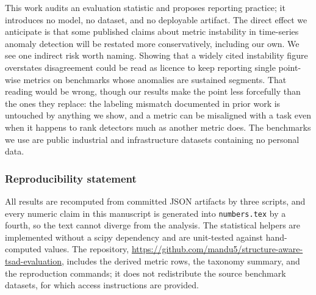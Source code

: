 \documentclass[twoside,11pt]{article}
\begin{document}
This work audits an evaluation statistic and proposes reporting practice; it
introduces no model, no dataset, and no deployable artifact. The direct effect
we anticipate is that some published claims about metric instability in
time-series anomaly detection will be restated more conservatively, including
our own. We see one indirect risk worth naming. Showing that a widely cited
instability figure overstates disagreement could be read as licence to keep
reporting single point-wise metrics on benchmarks whose anomalies are sustained
segments. That reading would be wrong, though our results make the point less forcefully
than the ones they replace: the labeling mismatch documented in prior work is
untouched by anything we show, and a metric can be misaligned with a task even
when it happens to rank detectors much as another metric does. The
benchmarks we use are public industrial and infrastructure datasets containing
no personal data.

\subsubsection*{Reproducibility statement}

All results are recomputed from committed JSON artifacts by three scripts, and
every numeric claim in this manuscript is generated into \texttt{numbers.tex} by
a fourth, so the text cannot diverge from the analysis. The statistical helpers
are implemented without a scipy dependency and are unit-tested against
hand-computed values. The repository,
\url{https://github.com/mandu5/structure-aware-tsad-evaluation}, includes the
derived metric rows, the taxonomy summary, and the reproduction commands; it does not redistribute the
source benchmark datasets, for which access instructions are provided.

\end{document}
